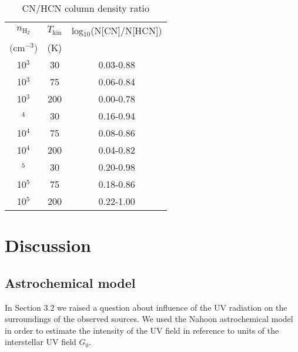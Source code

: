 \documentclass{aa}
\begin{document}
\begin{table}
\caption{CN/HCN column density ratio}             %
\label{table:5}      %
\centering                          %
\begin{tabular}{c c c} 
\hline\hline  
$n_\mathrm{H_2}$ & $T_\mathrm{kin}$ & log$_{10}$(N[CN]/N[HCN]) \\
$($cm$^{-3})$ & (K) & \\
\hline
10$^{3}$ & 30 & 0.03-0.88\\
10$^{3}$ & 75 & 0.06-0.84\\
10$^{3}$ & 200 & 0.00-0.78\\ \hdashline
10$^{4}$ & 30 & 0.16-0.94\\
10$^{4}$ & 75 & 0.08-0.86\\
10$^{4}$ & 200 & 0.04-0.82\\ \hdashline
10$^{5}$ & 30 & 0.20-0.98\\
10$^{5}$ & 75 & 0.18-0.86\\
10$^{5}$ & 200 & 0.22-1.00\\ \hline
\end{tabular}
\end{table} 


\section{Discussion}

\subsection{Astrochemical model}

In Section 3.2 we raised a question about influence of the UV radiation on the surroundings of the observed sources. We used the Nahoon astrochemical model in order to estimate the intensity of the UV field in reference to units of the interstellar UV field $G_0$.
\end{document}
